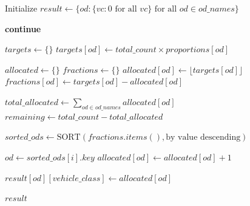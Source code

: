 \begin{algorithm}
\caption{Batch Perfect Allocation using piecewise linear interpolation}
\label{alg:batch_perfect}
\begin{algorithmic}[1]
    \State Initialize $result \gets \{od: \{vc: 0 \text{ for all } vc\} \text{ for all } od \in od\_names\}$
    
            \State \textbf{continue}
        \EndIf
        
        \State $targets \gets \{\}$ 
            \State $targets[od] \gets total\_count \times proportions[od]$
        \EndFor
        
        \State {}
        \State $allocated \gets \{\}$
        \State $fractions \gets \{\}$
            \State $allocated[od] \gets \lfloor targets[od] \rfloor$
            \State $fractions[od] \gets targets[od] - allocated[od]$
        \EndFor
        
        \State $total\_allocated \gets \sum_{od \in od\_names} allocated[od]$
        \State $remaining \gets total\_count - total\_allocated$
        
            \State {}
            \State $sorted\_ods \gets \text{SORT}(fractions.items(), \text{by value descending})$
            
                \State $od \gets sorted\_ods[i].key$
                \State $allocated[od] \gets allocated[od] + 1$
            \EndFor
        \EndIf
        
        \State {}
            \State $result[od][vehicle\_class] \gets allocated[od]$
        \EndFor
    \EndFor
    
    \State \Return $result$
\EndProcedure
\end{algorithmic}
\end{algorithm}

